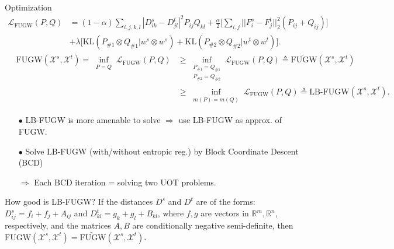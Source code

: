\documentclass{beamer}
\newcommand{\fugw}{\text{FUGW}}
\newcommand{\kl}{\text{KL}}
\newcommand{\cX}{\mathcal X}
\newcommand{\cL}{\mathcal L}
\newcommand{\bbR}{\mathbb R}
\begin{document}
\begin{frame}{Optimization}
\scriptsize
\vspace{-1.5cm}
\begin{align*}
  \cL_{\fugw}(P, Q) &=
  (1 - \alpha) \sum_{i,j,k,l} | D^s_{ik} - D^t_{jl}|^2 P_{ij} Q_{kl}
  + \frac{\alpha}{2} \Big[ \sum_{i,j} || F^s_i - F^t_j||_2^2 (P_{ij} + Q_{ij}) \Big] \\
  &+ \lambda \Big[ \kl(P_{\# 1} \otimes Q_{\# 1} \vert w^s \otimes w^s)
  + \kl(P_{\# 2} \otimes Q_{\# 2} \vert w^t \otimes w^t) \Big].
\end{align*}
\vspace{-0.7cm}
\begin{align*}
  \quad \fugw(\cX^s, \cX^t) = \inf_{\substack{P = Q}}
  \cL_{\fugw}(P, Q) &\geq \inf_{\substack{P_{\#1} = Q_{\#1} \\ P_{\#2} = Q_{\#2}}}
  \cL_{\fugw}(P, Q) \triangleq \widetilde{\fugw}(\cX^s, \cX^t) \\
  &\geq \inf_{\substack{m(P) = m(Q)}}
  \cL_{\fugw}(P, Q) \triangleq \text{LB-FUGW} (\cX^s, \cX^t).
\end{align*}
\vspace{-0.4cm}
\begin{itemize}
  \item[$\bullet$] LB-FUGW is more amenable to solve
  $\Rightarrow$ use LB-FUGW as approx. of FUGW.
  \item[$\bullet$] Solve LB-FUGW (with/without entropic reg.)
  by Block Coordinate Descent (BCD)

  $\Rightarrow$ Each BCD iteration = solving two UOT problems.
\end{itemize}
\begin{block}{How good is LB-FUGW?}
  If the distances $D^s$ and $D^t$ are of the forms: $D^s_{ij} = f_i + f_j + A_{ij}$ and
  $D^t_{kl} = g_k + g_l + B_{kl}$, where $f, g$ are vectors in $\bbR^m, \bbR^n$, respectively,
  and the matrices $A, B$ are conditionally negative semi-definite, then
  $\fugw (\cX^s, \cX^t) = \widetilde{\fugw}(\cX^s, \cX^t)$.
\end{block}


\end{frame}
\end{document}
